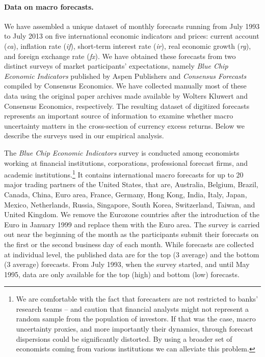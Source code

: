 \paragraph{Data on macro forecasts.}
We have assembled a unique dataset of monthly forecasts running from July 1993 to July 2013 on five international economic indicators and prices: current account (\emph{ca}), inflation rate (\emph{if}), short-term interest rate (\emph{ir}),  real economic growth (\emph{rg}), and foreign exchange rate (\emph{fx}). We have obtained these forecasts from two distinct surveys of market participants' expectations, namely \emph{Blue Chip Economic Indicators} published by Aspen Publishers and \emph{Consensus Forecasts} compiled by Consensus Economics. We have collected manually most of these data using the original paper archives made available by Wolters Kluwert and Consensus Economics, respectively. The resulting dataset of digitized forecasts represents an important source of information to examine whether macro uncertainty matters in the cross-section of currency excess returns. Below we describe the surveys used in our empirical analysis. %

The \emph{Blue Chip Economic Indicators} survey is conducted among economists working at financial institutions, corporations, professional forecast firms, and academic institutions.\footnote{We are comfortable with the fact that forecasters are not restricted to banks' research teams -- \citet{anderson_etal2005} and \citet{kim_zapatero2011} caution that financial analysts might not represent a random sample from the population of investors. If that was the case, macro uncertainty proxies, and more importantly their dynamics, through forecast dispersions could be significantly distorted. By using a broader set of economists coming from various institutions we can alleviate this problem.} It contains international macro forecasts for up to 20 major trading partners of the United States, that are, Australia, Belgium, Brazil, Canada, China, Euro area, France, Germany, Hong Kong, India, Italy, Japan, Mexico, Netherlands, Russia, Singapore, South Korea, Switzerland, Taiwan, and United Kingdom. We remove the Eurozone countries after the introduction of the Euro in January 1999 and replace them with the Euro area. The survey is carried out near the beginning of the month as the participants submit their forecasts on the first or the second business day of each month. While forecasts are collected at individual level, the published data are for the top (3 average) and the bottom (3 average) forecasts. From July 1993, when the survey started, and until May 1995, data are only available for the top (high) and bottom (low) forecasts.


